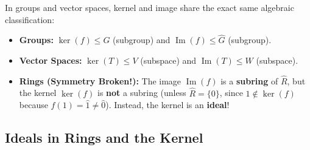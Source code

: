 \begin{content}

\begin{steps}
In groups and vector spaces, kernel and image share the exact same algebraic classification:
\begin{itemize}
    \item \textbf{Groups:} $\operatorname{ker}(f) \le G$ (subgroup) and $\operatorname{Im}(f) \le \hat{G}$ (subgroup).
    \item \textbf{Vector Spaces:} $\ker(T) \le V$ (subspace) and $\operatorname{Im}(T) \le W$ (subspace).
    \item \textbf{Rings (Symmetry Broken!):} The image $\operatorname{Im}(f)$ is a \textbf{subring} of $\hat{R}$, but the kernel $\operatorname{ker}(f)$ is \textbf{not} a subring (unless $\hat{R} = \{0\}$, since $1 \notin \operatorname{ker}(f)$ because $f(1) = \hat{1} \neq \hat{0}$). Instead, the kernel is an \textbf{ideal}!
\end{itemize}
\end{steps}
\end{content}

\subsection{Ideals in Rings and the Kernel}

